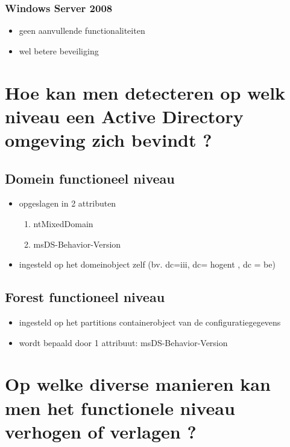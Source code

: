 \subsubsection{Windows Server 2008}
\begin{itemize}
\item geen aanvullende functionaliteiten
\item wel betere beveiliging
\end{itemize}

\section{Hoe kan men detecteren op welk niveau een Active Directory omgeving zich bevindt ?}
\subsection{Domein functioneel niveau}
\begin{itemize}
\item opgeslagen in 2 attributen
\begin{enumerate}
\item ntMixedDomain
\item msDS-Behavior-Version
\end{enumerate}
\item ingesteld op het domeinobject zelf (bv. dc=iii, dc= hogent , dc = be)
\end{itemize}

\subsection{Forest functioneel niveau}
\begin{itemize}
\item ingesteld op het partitions containerobject van de configuratiegegevens
\item wordt bepaald door 1 attribuut: msDS-Behavior-Version
\end{itemize}

\section{Op welke diverse manieren kan men het functionele niveau verhogen of verlagen ?}

